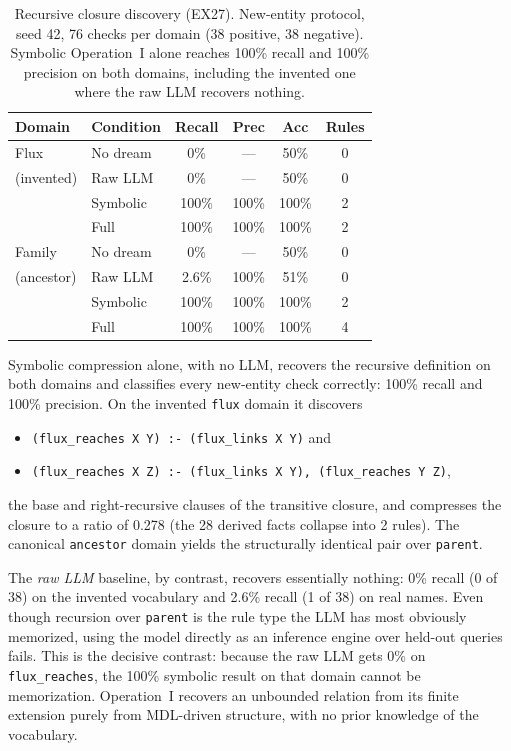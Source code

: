\documentclass[10pt,conference]{IEEEtran}
\begin{document}
\begin{table}[t]
\centering
\caption{Recursive closure discovery (EX27). New-entity protocol, seed 42, 76 checks per domain (38 positive, 38 negative). Symbolic Operation~I alone reaches 100\% recall and 100\% precision on both domains, including the invented one where the raw LLM recovers nothing.}
\label{tab:recursion}
\begin{tabular}{llcccc}
\toprule
\textbf{Domain} & \textbf{Condition} & \textbf{Recall} & \textbf{Prec} & \textbf{Acc} & \textbf{Rules} \\
\midrule
Flux     & No dream  & 0\%   & ---    & 50\%   & 0 \\
(invented) & Raw LLM   & 0\%   & ---    & 50\%   & 0 \\
         & Symbolic  & 100\% & 100\%  & 100\%  & 2 \\
         & Full      & 100\% & 100\%  & 100\%  & 2 \\
\midrule
Family   & No dream  & 0\%   & ---    & 50\%   & 0 \\
(ancestor) & Raw LLM   & 2.6\% & 100\%  & 51\%   & 0 \\
         & Symbolic  & 100\% & 100\%  & 100\%  & 2 \\
         & Full      & 100\% & 100\%  & 100\%  & 4 \\
\bottomrule
\end{tabular}
\end{table}

Symbolic compression alone, with no LLM, recovers the recursive definition on both domains and classifies every new-entity check correctly: 100\% recall and 100\% precision. On the invented \texttt{flux} domain it discovers
\begin{itemize}
\item \texttt{(flux\_reaches X Y) :- (flux\_links X Y)} and
\item \texttt{(flux\_reaches X Z) :- (flux\_links X Y), (flux\_reaches Y Z)},
\end{itemize}
the base and right-recursive clauses of the transitive closure, and compresses the closure to a ratio of 0.278 (the 28 derived facts collapse into 2 rules). The canonical \texttt{ancestor} domain yields the structurally identical pair over \texttt{parent}.

The \textit{raw LLM} baseline, by contrast, recovers essentially nothing: 0\% recall (0 of 38) on the invented vocabulary and 2.6\% recall (1 of 38) on real names. Even though recursion over \texttt{parent} is the rule type the LLM has most obviously memorized, using the model directly as an inference engine over held-out queries fails. This is the decisive contrast: because the raw LLM gets 0\% on \texttt{flux\_reaches}, the 100\% symbolic result on that domain cannot be memorization. Operation~I recovers an unbounded relation from its finite extension purely from MDL-driven structure, with no prior knowledge of the vocabulary.
\end{document}
